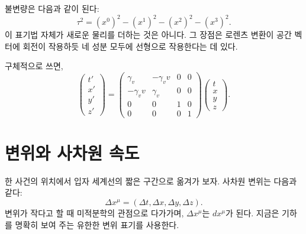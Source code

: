 불변량은 다음과 같이 된다:
\begin{equation}
\tau^2
=(x^0)^2-(x^1)^2-(x^2)^2-(x^3)^2.
\end{equation}
이 표기법 자체가 새로운 물리를 더하는 것은 아니다. 그 장점은 로렌츠 변환이 공간 벡터에 회전이 작용하듯 네 성분 모두에 선형으로 작용한다는 데 있다.

\begin{classroomqa}
\end{classroomqa}

구체적으로 쓰면,
\begin{equation}
\begin{pmatrix}
t'\\x'\\y'\\z'
\end{pmatrix}
=
\begin{pmatrix}
\gamma_v&-\gamma_v v&0&0\\
-\gamma_v v&\gamma_v&0&0\\
0&0&1&0\\
0&0&0&1
\end{pmatrix}
\begin{pmatrix}
t\\x\\y\\z
\end{pmatrix}.
\label{eq:sr2-boost-matrix}
\end{equation}

\section{변위와 사차원 속도}

한 사건의 위치에서 입자 세계선의 짧은 구간으로 옮겨가 보자. 사차원 변위는 다음과 같다:
\begin{equation}
\Delta x^\mu
=(\Delta t,\Delta x,\Delta y,\Delta z).
\end{equation}
변위가 작다고 할 때 미적분학의 관점으로 다가가며, \(\Delta x^\mu\)는 \(dx^\mu\)가 된다. 지금은 기하를 명확히 보여 주는 유한한 변위 표기를 사용한다.

